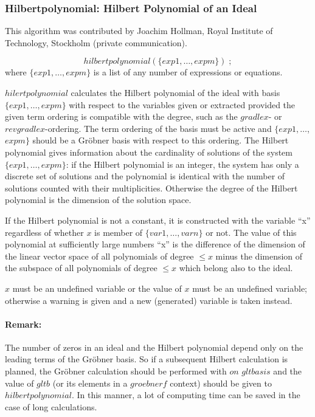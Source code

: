 \subsubsection{Hilbertpolynomial: Hilbert Polynomial of an Ideal}
This algorithm was contributed by {\sc Joachim Hollman}, Royal
Institute of Technology, Stockholm (private communication).

\[
hilbertpolynomial (\{exp1, \ldots , expm\})\;;
\]
where $\{exp1, \ldots , expm\}$ is a list of any number of expressions
or equations.

$hilertpolynomial$ calculates the Hilbert polynomial of the ideal
with basis $\{exp1, \ldots , expm\}$ with respect to the
variables given or extracted provided the given term ordering is
compatible with the degree, such as the $gradlex$- or $revgradlex$-ordering.
The term ordering of the basis
must be active and $\{exp1, \ldots$, $ expm\}$ should be a
Gr\"obner basis with respect to this ordering. The Hilbert polynomial
gives information about the cardinality of solutions of the system
$\{exp1, \ldots , expm\}$: if the Hilbert polynomial is an
integer, the system has only a discrete set of solutions and the
polynomial is identical with the number of solutions counted with
their multiplicities. Otherwise the degree of the Hilbert
polynomial is the dimension of the solution space.

If the Hilbert polynomial is not a constant, it is constructed with the
variable ``x'' regardless of whether $x$ is member of
$\{var1, \ldots , varn\}$ or not. The value of this polynomial at
sufficiently large numbers  ``x'' is the difference
of the dimension of the linear vector space of all polynomials of degree
$ \leq x $ minus the dimension of the subspace of all polynomials of
degree $\leq x $ which belong also to the ideal.

$x$ must be an undefined variable or the value of $x$ must be an undefined
variable; otherwise a warning is given and a new (generated) variable
is taken instead.
 
\paragraph{Remark:} The number of zeros in an ideal and the
Hilbert polynomial depend only on the leading terms of the
Gr\"obner basis. So if a subsequent Hilbert calculation is planned, the
Gr\"obner calculation should be performed with $on$ $gltbasis$ and
the value of $gltb$ (or its elements in a $groebnerf$ context) should be
given to $hilbertpolynomial$. In this manner, a lot of computing time can be
saved in the case of long calculations.


